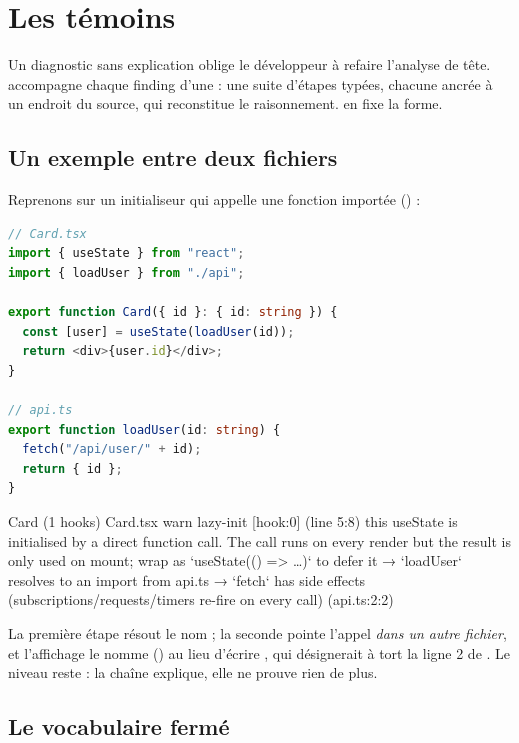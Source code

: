 \section{Les témoins}
\label{sec:api-regles-temoins}

Un diagnostic sans explication oblige le développeur à refaire l'analyse de tête. \reactant{} accompagne chaque finding d'une  : une suite d'étapes typées, chacune ancrée à un endroit du source, qui reconstitue le raisonnement.  en fixe la forme.

\subsection{Un exemple entre deux fichiers}

Reprenons  sur un initialiseur qui appelle une fonction importée () :

\begin{lstlisting}[language=TypeScript,caption={\file{Card.tsx} et \file{api.ts}}]
// Card.tsx
import { useState } from "react";
import { loadUser } from "./api";

export function Card({ id }: { id: string }) {
  const [user] = useState(loadUser(id));
  return <div>{user.id}</div>;
}

// api.ts
export function loadUser(id: string) {
  fetch("/api/user/" + id);
  return { id };
}
\end{lstlisting}

\begin{sortie}
  Card  (1 hooks)  Card.tsx
    warn   lazy-init  [hook:0]  (line 5:8)  this useState is initialised by a direct function call. The call runs on every render but the result is only used on mount; wrap as `useState(() => …)` to defer it
       → `loadUser` resolves to an import from api.ts
       → `fetch` has side effects (subscriptions/requests/timers re-fire on every call) (api.ts:2:2)
\end{sortie}

La première étape résout le nom  ; la seconde pointe l'appel  \emph{dans un autre fichier}, et l'affichage le nomme () au lieu d'écrire , qui désignerait à tort la ligne 2 de . Le niveau reste \Warning{} : la chaîne explique, elle ne prouve rien de plus.

\subsection{Le vocabulaire fermé}

